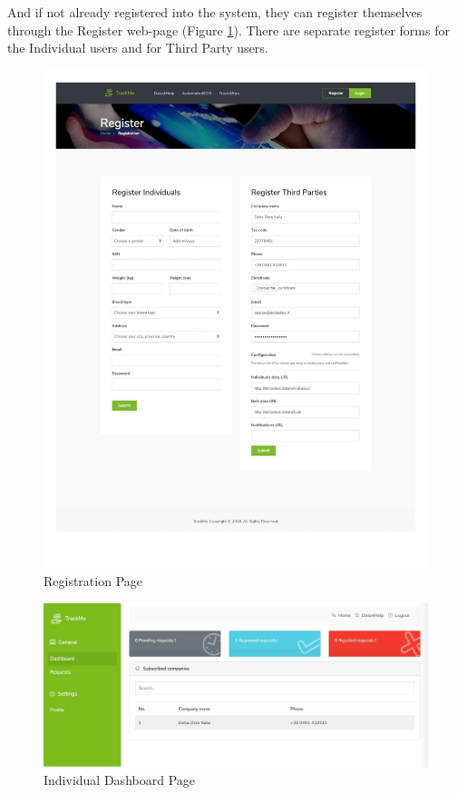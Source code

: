 \documentclass[a4paper, hidelinks, 12pt]{report}
\begin{document}
	 And if not already registered into the system, they can register themselves through the Register web-page (Figure \ref{fig:Registration}). There are separate register forms for the Individual users and for Third Party users.
	 \begin{figure}[H]
		\centering
		\includegraphics[scale=0.35]{UI/UI/10.jpeg}
		\caption[UI: Registration Page]{Registration Page}
		\label{fig:Registration}
	\end{figure}
	
	\begin{figure}[H]
		\centering
		\includegraphics[width=1\textwidth]{UI/UI/2.jpeg}
		\caption[UI: Individual Dashboard Page]{Individual Dashboard Page}
		\label{fig:Dashboard for individuals}
	\end{figure}
\end{document}
